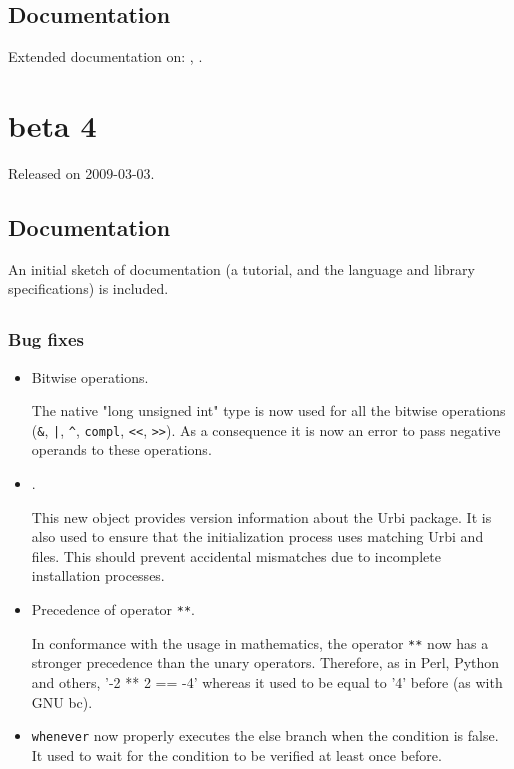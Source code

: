 \subsection{Documentation}

Extended documentation on: , .


\section{ beta 4}
Released on 2009-03-03.

\subsection{Documentation}

An initial sketch of documentation (a tutorial, and the language and
library specifications) is included.

\subsection{\us}
\subsubsection{Bug fixes}

\begin{itemize}
\item Bitwise operations.

  The native "long unsigned int" type is now used for all the bitwise
  operations (\lstinline|&|, \lstinline{|}, \lstinline|^|,
  \lstinline|compl|, \lstinline|<<|, \lstinline|>>|).  As a consequence it
  is now an error to pass negative operands to these operations.

\item {}.

  This new object provides version information about the Urbi package.  It
  is also used to ensure that the initialization process uses matching Urbi
  and \Cxx files.  This should prevent accidental mismatches due to
  incomplete installation processes.

\item Precedence of operator \lstinline|**|.

  In conformance with the usage in mathematics, the operator \lstinline|**|
  now has a stronger precedence than the unary operators.  Therefore, as in
  Perl, Python and others, '-2 ** 2 == -4' whereas it used to be equal to
  '4' before (as with GNU bc).

\item \lstinline|whenever| now properly executes the else branch when the
  condition is false.  It used to wait for the condition to be verified at
  least once before.
\end{itemize}

